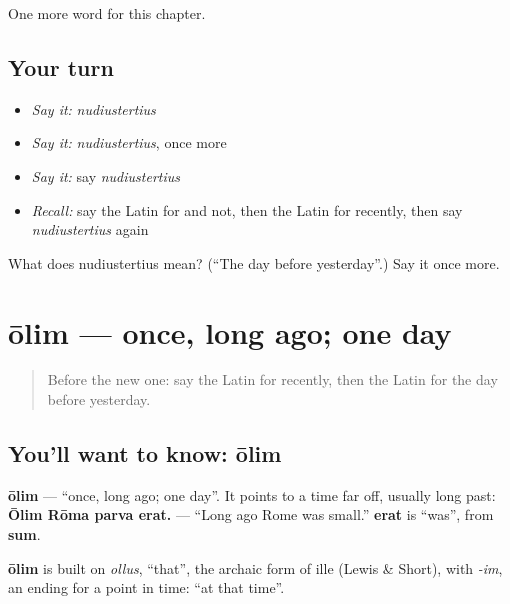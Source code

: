 \begin{grammarlens}[title={What you've built}]
One more word for this chapter.
\end{grammarlens}

\subsection*{Your turn}
\begin{itemize}
\raggedright
  \item \emph{Say it:} \emph{nudiustertius}
  \item \emph{Say it:} \emph{nudiustertius}, once more
  \item \emph{Say it:} say \emph{nudiustertius}
  \item \emph{Recall:} say the Latin for and not, then the Latin for recently, then say \emph{nudiustertius} again
\end{itemize}

\begin{tcolorbox}[breakable,colback=teal!4,colframe=teal!35!black,title={Before you move on}]
What does nudiustertius mean? (\textquotedblleft{}The day before yesterday\textquotedblright{}.) Say it once more.
\end{tcolorbox}
\section[ōlim]{ōlim — once, long ago; one day}

\label{lesson:LA-C162-olim}



\begin{quote}
Before the new one: say the Latin for recently, then the Latin for the day before yesterday.
\end{quote}

\subsection*{You'll want to know: ōlim}
\textbf{ōlim} — \textquotedblleft{}once, long ago; one day\textquotedblright{}. It points to a time far off, usually long past: \textbf{Ōlim Rōma parva erat.} — \textquotedblleft{}Long ago Rome was small.\textquotedblright{} \textbf{erat} is \textquotedblleft{}was\textquotedblright{}, from \textbf{sum}.

\begin{cousinweb}
\textbf{ōlim} is built on \emph{ollus}, \textquotedblleft{}that\textquotedblright{}, the archaic form of ille (Lewis \& Short), with \emph{-im}, an ending for a point in time: \textquotedblleft{}at that time\textquotedblright{}.
\end{cousinweb}

